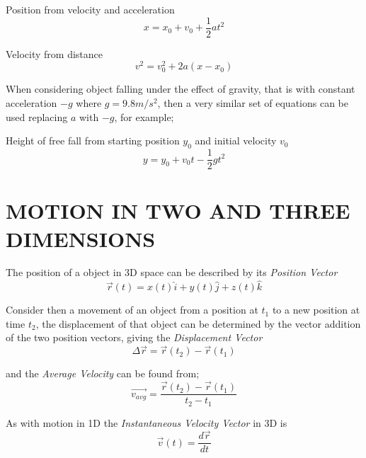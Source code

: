 \documentclass[12pt, letterpaper, twoside]{article}
\begin{document}
Position from velocity and acceleration
\begin{equation}
x = x_0 + v_0 + \frac{1}{2} a t^2
\end{equation} 


Velocity from distance 
\begin{equation}
v^2 = v_0^2 + 2a(x - x_0)
\end{equation}


\bigskip

When considering object falling under the effect of gravity, that is with constant acceleration $-g$ where $g=9.8m/s^2$, then a very similar set of equations can be used replacing $a$ with $-g$, for example;

Height of free fall from starting position $y_0$ and initial velocity $v_0$
\begin{equation}
y = y_0 + v_0 t - \frac{1}{2} g t^2
\end{equation}


\newpage

\section{MOTION IN TWO AND THREE DIMENSIONS}
\bigskip

The position of a object in 3D space can be described by its \emph{Position Vector}
\begin{equation}
\overrightarrow{r}(t) = x(t) \hat{i} + y(t) \hat{j} + z(t) \hat{k}
\end{equation}


\bigskip

Consider then a movement of an object from a position at $t_1$ to a new position at time $t_2$, the displacement of that object can be determined by the vector addition of the two position vectors, giving the \emph{Displacement Vector}
\begin{equation}
\Delta \overrightarrow{r}=\overrightarrow{r}(t_2) -  \overrightarrow{r}(t_1)
\end{equation}

\bigskip
and the \emph{Average Velocity} can be found from;
\begin{equation}
\overrightarrow{v_{avg}} = \frac{\overrightarrow{r}(t_2) -  \overrightarrow{r}(t_1)}{t_2 - t_1}
\end{equation}


As with motion in 1D the \emph{Instantaneous Velocity Vector} in 3D is 
\begin{equation}
\overrightarrow{v}(t)= \frac{d \overrightarrow{r}}{dt}
\end{equation}
\end{document}
